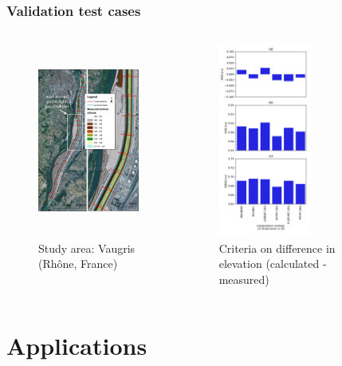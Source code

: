 \documentclass[10pt]{beamer}
\begin{document}
\begin{frame}\frametitle{Validation test cases}
  \vspace{-0.5cm}
  \begin{columns}[T,onlytextwidth]
    \begin{figure}[H]
            \centering
            \includegraphics[height=6.4cm]{figures/map_VS.png}
        \caption{Study area: Vaugris (Rhône, France)}
    \end{figure}

    \begin{figure}[H]
            \centering
            \includegraphics[height=6.4cm]{figures/criteria_VS.png}
        \caption{Criteria on difference in elevation (calculated - measured)}
    \end{figure}
  \end{columns}

\end{frame}


\section{Applications}
\end{document}
